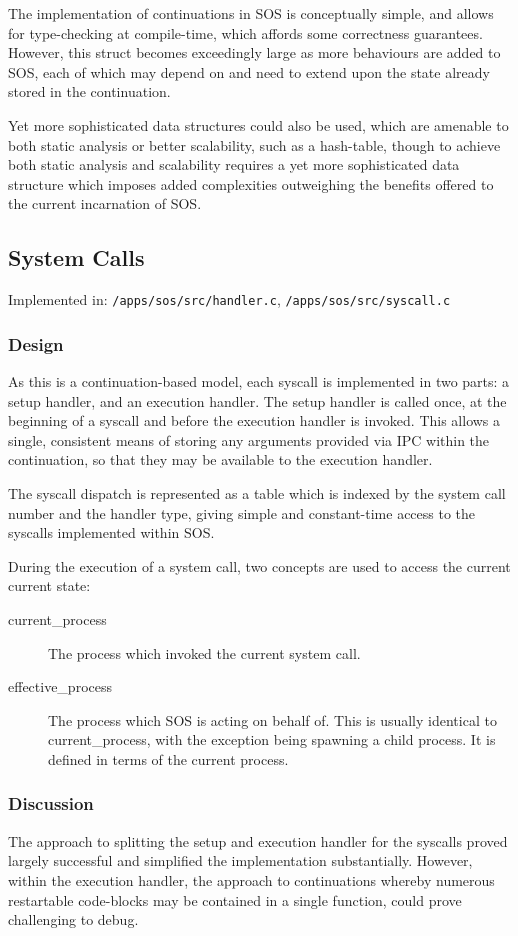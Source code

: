 \documentclass[a4paper,12pt]{article}
\begin{document}
The implementation of continuations in SOS is conceptually simple, and allows
for type-checking at compile-time, which affords some correctness guarantees.
However, this struct becomes exceedingly large as more behaviours are added to
SOS, each of which may depend on and need to extend upon the state already
stored in the continuation.

Yet more sophisticated data structures could also be used, which are amenable
to both static analysis or better scalability, such as a hash-table, though to
achieve both static analysis and scalability requires a yet more sophisticated
data structure which imposes added complexities outweighing the benefits
offered to the current incarnation of SOS.

\subsection{System Calls}
Implemented in: \texttt{/apps/sos/src/handler.c}, \texttt{/apps/sos/src/syscall.c}

\subsubsection{Design}
As this is a continuation-based model, each syscall is implemented in two
parts: a setup handler, and an execution handler.  The setup handler is called
once, at the beginning of a syscall and before the execution handler is
invoked.  This allows a single, consistent means of storing any arguments
provided via IPC within the continuation, so that they may be available to the
execution handler.

The syscall dispatch is represented as a table which is indexed by the system
call number and the handler type, giving simple and constant-time access to
the syscalls implemented within SOS.

During the execution of a system call, two concepts are used to access the
current current state:
\begin{description}
\item[current\_process] The process which invoked the current system call.
\item[effective\_process] The process which SOS is acting on behalf of.  This
  is usually identical to current\_process, with the exception being spawning
  a child process.  It is defined in terms of the current process.
\end{description}

\subsubsection{Discussion}
The approach to splitting the setup and execution handler for the syscalls
proved largely successful and simplified the implementation substantially.  However,
within the execution handler, the approach to continuations whereby numerous
restartable code-blocks may be contained in a single function, could prove
challenging to debug.
\end{document}
